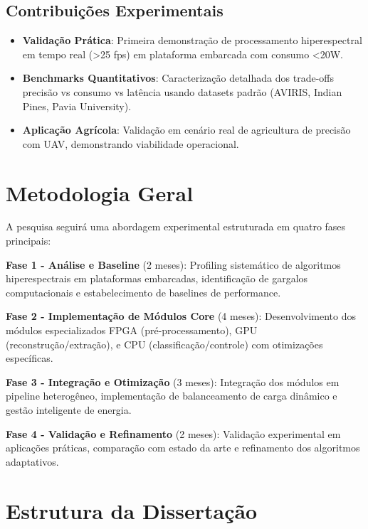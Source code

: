 \subsection{Contribuições Experimentais}

\begin{itemize}
\item \textbf{Validação Prática}: Primeira demonstração de processamento hiperespectral em tempo real (>25 fps) em plataforma embarcada com consumo <20W.

\item \textbf{Benchmarks Quantitativos}: Caracterização detalhada dos trade-offs precisão vs consumo vs latência usando datasets padrão (AVIRIS, Indian Pines, Pavia University).

\item \textbf{Aplicação Agrícola}: Validação em cenário real de agricultura de precisão com UAV, demonstrando viabilidade operacional.
\end{itemize}

\section{Metodologia Geral}

A pesquisa seguirá uma abordagem experimental estruturada em quatro fases principais:

\textbf{Fase 1 - Análise e Baseline} (2 meses): Profiling sistemático de algoritmos hiperespectrais em plataformas embarcadas, identificação de gargalos computacionais e estabelecimento de baselines de performance.

\textbf{Fase 2 - Implementação de Módulos Core} (4 meses): Desenvolvimento dos módulos especializados FPGA (pré-processamento), GPU (reconstrução/extração), e CPU (classificação/controle) com otimizações específicas.

\textbf{Fase 3 - Integração e Otimização} (3 meses): Integração dos módulos em pipeline heterogêneo, implementação de balanceamento de carga dinâmico e gestão inteligente de energia.

\textbf{Fase 4 - Validação e Refinamento} (2 meses): Validação experimental em aplicações práticas, comparação com estado da arte e refinamento dos algoritmos adaptativos.

\section{Estrutura da Dissertação}

